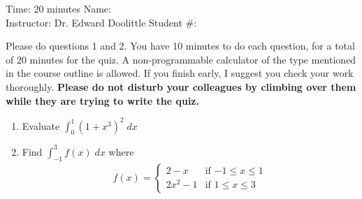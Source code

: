 \documentclass[12pt]{article}
\newcommand{\ds}{\displaystyle}
\begin{document}
\thispagestyle{plain}

\begin{flushleft}
Time:  20 minutes                \hfill       Name: \underline{\hspace{2in}} \\
Instructor: Dr. Edward Doolittle \hfill Student \#: \underline{\hspace{2in}}
\end{flushleft}

\noindent
Please do questions 1 and 2.  You have 10 minutes
to do each question, for a total of 20
minutes for the quiz.  A non-programmable
calculator of the type mentioned in the course outline is allowed.
If you finish early, I suggest you check your work thoroughly.
\textbf{Please do not disturb your colleagues by climbing over them while
they are trying to write the quiz.}

\begin{enumerate}
\item Evaluate 
  $\ds \int_0^1 (1+x^3)^2 \; dx$
\vfill
\newpage
\item Find 
  $\ds \int_{-1}^3 f(x) \; dx$
  where 
  \begin{align*}
    f(x) = \begin{cases}
      2-x     & \mbox{if $-1\le x\le 1$} \\
      2x^2 -1 & \mbox{if $1\le x \le 3$}
    \end{cases}
  \end{align*}
\vfill
\end{enumerate}
\end{document}
